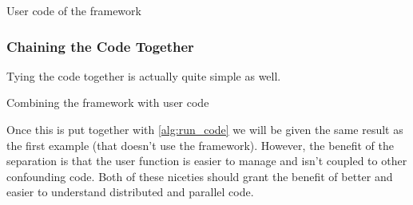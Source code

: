 \begin{algorithm}
\begin{algorithmic}
\EndFunction{}
\end{algorithmic}
\label{alg:ocmf_user_code}
\caption{User code of the framework}
\end{algorithm}

\subsubsection{Chaining the Code Together}

Tying the code together is actually quite simple as well.

\begin{algorithm}
\begin{algorithmic}
     
    \Else {}
    \EndIf{}
\EndFunction{}
\end{algorithmic}
\label{alg:run_code}
\caption{Combining the framework with user code}
\end{algorithm}

Once this is put together with \cref{alg:run_code} we will be given the same
result as the first example (that doesn't use the framework). However, the
benefit of the separation is that the user function is easier to manage and
isn't coupled to other confounding code. Both of these niceties should grant
the benefit of better and easier to understand distributed and parallel code.
